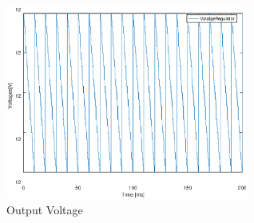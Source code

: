 \begin{figure}[H] 
\centering
\includegraphics[width = 8cm]{VoltageRegulator.eps} 
\caption{Output Voltage}
\label{fig:first}
\end{figure}


